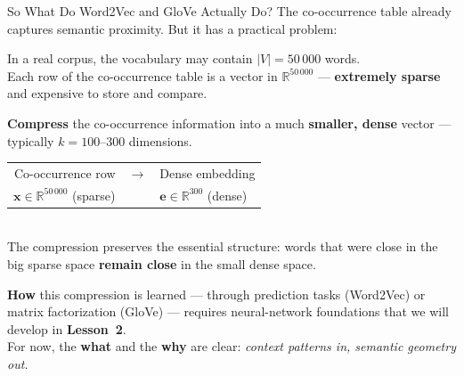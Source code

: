\documentclass[aspectratio=169]{beamer}
\begin{document}
\begin{frame}{So What Do Word2Vec and GloVe Actually Do?}
\footnotesize
The co-occurrence table already captures semantic proximity.
But it has a practical problem:

\begin{tcolorbox}[colback=red!5!white, colframe=red!70!black,
  title=\textbf{The curse of dimensions}]
In a real corpus, the vocabulary may contain
$|V| = 50\,000$ words.\\[4pt]
Each row of the co-occurrence table is a vector in
$\mathbb{R}^{50\,000}$ --- \textbf{extremely sparse}
and expensive to store and compare.
\end{tcolorbox}

\begin{tcolorbox}[colback=green!5!white, colframe=green!60!black,
  title=\textbf{The key idea behind embedding models}]
\textbf{Compress} the co-occurrence information into a much
\textbf{smaller, dense} vector --- typically
$k = 100$--$300$ dimensions.\\[6pt]
\renewcommand{\arraystretch}{1.4}
\begin{tabular}{r c l}
Co-occurrence row & $\longrightarrow$ & Dense embedding \\
$\mathbf{x} \in \mathbb{R}^{50\,000}$ (sparse)
  & & $\mathbf{e} \in \mathbb{R}^{300}$ (dense) \\
\end{tabular}\\[6pt]
The compression preserves the essential structure:
words that were close in the big sparse space
\textbf{remain close} in the small dense space.
\end{tcolorbox}

\bigskip

\begin{tcolorbox}[colback=gray!8, colframe=gray!60]
\textbf{How} this compression is learned
--- through prediction tasks (Word2Vec)
or matrix factorization (GloVe) ---
requires neural-network foundations
that we will develop in \textbf{Lesson~2}.\\[2pt]
For now, the \textbf{what} and the \textbf{why} are clear:
\emph{context patterns in, semantic geometry out.}
\end{tcolorbox}

\end{frame}
%
%
\end{document}

